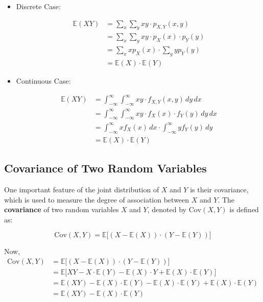 \documentclass[twoside]{book}
\begin{document}
\begin{itemize}

\item{Discrete Case}:

\begin{align*}
    \mathbb{E}(XY) &= \sum_{x} \sum_{y} xy \cdot p_{X,Y}(x, y)\\
    &=\sum_{x} \sum_{y} xy \cdot p_{X}(x)\cdot p_{Y}(y)\\
    &= \sum_{x} x p_X(x) \cdot  \sum_{y} y p_Y(y) \\
    &= \mathbb{E}(X) \cdot \mathbb{E}(Y)
\end{align*}

\item{Continuous Case}:

\begin{align*}
    \mathbb{E}(XY) &= \int_{-\infty}^{\infty} \int_{-\infty}^{\infty} xy \cdot f_{X,Y}(x, y) \, dy \, dx\\
    &= \int_{-\infty}^{\infty} \int_{-\infty}^{\infty} xy \cdot f_X(x)\cdot f_Y(y) \, dy \, dx\\
    &= \int_{-\infty}^{\infty} x f_X(x) \, dx\cdot  \int_{-\infty}^{\infty} y f_Y(y) \, dy \\
    &= \mathbb{E}(X) \cdot \mathbb{E}(Y)
\end{align*}

\end{itemize}
\vspace{1em}


\subsection{Covariance of Two Random Variables}

One important feature of the joint distribution of $X$ and $Y$ is their covariance, which is used to measure the degree of association between $X$ and $Y$. The \textbf{covariance} of two random variables \( X \) and \( Y \), denoted by \( \mathrm{Cov}(X, Y) \) is defined as:
\begin{textbox}
    \[
\mathrm{Cov}(X, Y) = \mathbb{E}\big[(X - \mathbb{E}(X))\cdot (Y - \mathbb{E}(Y))\big]
\]
\end{textbox}

Now, 
\begin{align*}
\mathrm{Cov}(X, Y) 
&= \mathbb{E}\big[(X - \mathbb{E}(X))\cdot(Y - \mathbb{E}(Y))\big] \\
&= \mathbb{E}\big[XY - X\cdot \mathbb{E}(Y) - \mathbb{E}(X)\cdot Y + \mathbb{E}(X)\cdot \mathbb{E}(Y)\big] \\
&= \mathbb{E}(XY) - \mathbb{E}(X)\cdot \mathbb{E}(Y) - \mathbb{E}(X)\cdot \mathbb{E}(Y) + \mathbb{E}(X)\cdot \mathbb{E}(Y) \\
&= \mathbb{E}(XY) - \mathbb{E}(X)\cdot \mathbb{E}(Y)
\end{align*}
\end{document}
